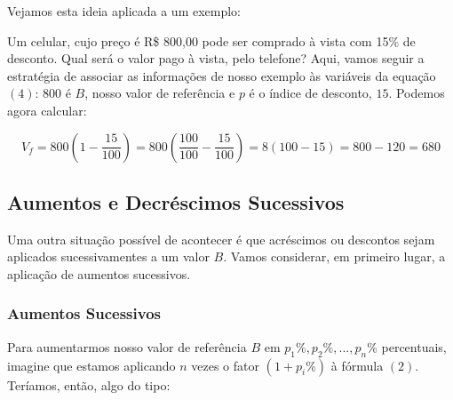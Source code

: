 \documentclass[12pt, a4paper, brazil]{abntex2}
\begin{document}
        Vejamos esta ideia aplicada a um exemplo:

        \begin{exemplo}
            Um celular, cujo preço é R\$ 800,00 pode ser comprado à vista com 15\% de desconto. Qual será o valor pago à vista, pelo telefone?
            Aqui, vamos seguir a estratégia de associar as informações de nosso exemplo às variáveis da equação $(4)$: 800 é $B$, nosso valor de referência e $p$ é o índice de desconto, $15$. Podemos agora calcular:

            \[
            V_f = 800\left(1 - \frac{15}{100}\right) = 800\left(\frac{100}{100}-\frac{15}{100}\right)=8(100-15)=800-120=680
            \]
        \end{exemplo}
        \bigskip

        \bigskip
        \subsection*{Aumentos e Decréscimos Sucessivos}

        Uma outra situação possível de acontecer é que acréscimos ou descontos sejam aplicados sucessivamentes a um valor $B$. Vamos considerar, em primeiro lugar, a aplicação de aumentos sucessivos.
        
        \subsubsection*{Aumentos Sucessivos}

        Para aumentarmos nosso valor de referência $B$ em $p_1\%, p_2\%, ..., p_n\%$ percentuais, imagine que estamos aplicando $n$ vezes o fator $\left(1+p_i\%\right)$ à fórmula $(2)$. Teríamos, então, algo do tipo:
        
\end{document}
